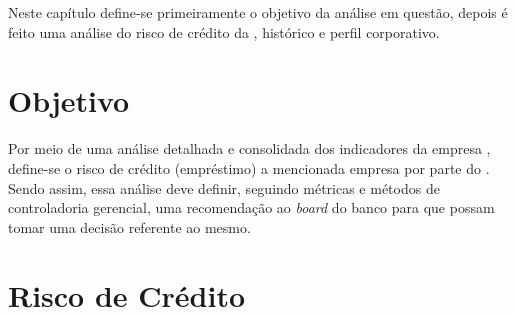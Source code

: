 Neste capítulo define-se primeiramente o objetivo da análise em questão, depois é feito uma análise do risco de crédito da \nomeCompletoPositivo{}, histórico e perfil corporativo. 

\section{Objetivo}

Por meio de uma análise detalhada e consolidada dos indicadores da empresa \nomeCompletoPositivo{}, define-se o risco de crédito (empréstimo) a mencionada empresa por parte do \emph{\nomeDoBanco{}}. Sendo assim, essa análise deve definir, seguindo métricas e métodos de controladoria gerencial, uma recomendação ao \emph{board} do banco para que possam tomar uma decisão referente ao mesmo.

\section{Risco de Crédito}




